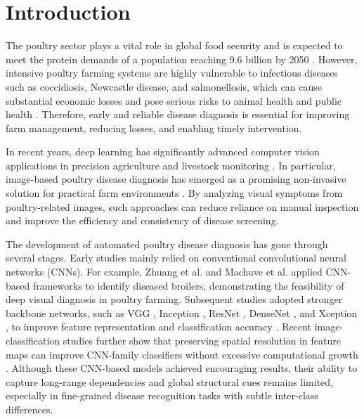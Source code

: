 \documentclass[review]{elsarticle}
\begin{document}
\linenumbers

\section{Introduction}

The poultry sector plays a vital role in global food security and is expected to meet the protein demands of a population reaching 9.6 billion by 2050 \cite{mottet2017global,hafez2020challenges}.
However, intensive poultry farming systems are highly vulnerable to infectious diseases such as coccidiosis, Newcastle disease, and salmonellosis, which can cause substantial economic losses and pose serious risks to animal health and public health \cite{fardin2025robust,abd2023poultry}.
Therefore, early and reliable disease diagnosis is essential for improving farm management, reducing losses, and enabling timely intervention.

In recent years, deep learning has significantly advanced computer vision applications in precision agriculture and livestock monitoring \cite{kamilaris2018deep,li2021survey,wang2022survey,zhang2023edge,waksman1997plantcondition,story2015greenhouse,kelly2016lesion,chen2021plantdisease,montalbo2022coffee,kaur2024cotton}.
In particular, image-based poultry disease diagnosis has emerged as a promising non-invasive solution for practical farm environments \cite{machuve2021machine,machuve2022poultry,srivastava2025integrated}.
By analyzing visual symptoms from poultry-related images, such approaches can reduce reliance on manual inspection and improve the efficiency and consistency of disease screening.

The development of automated poultry disease diagnosis has gone through several stages.
Early studies mainly relied on conventional convolutional neural networks (CNNs).
For example, Zhuang et al. \cite{zhuang2019detection} and Machuve et al. \cite{machuve2021machine,machuve2022poultry} applied CNN-based frameworks to identify diseased broilers, demonstrating the feasibility of deep visual diagnosis in poultry farming.
Subsequent studies adopted stronger backbone networks, such as VGG \cite{simonyan2014very}, Inception \cite{szegedy2016rethinking}, ResNet \cite{he2016deep}, DenseNet \cite{huang2017densely,mbelwa2021deep}, and Xception \cite{chollet2017xception}, to improve feature representation and classification accuracy \cite{lawal2024poultry,cina2023detection}.
Recent image-classification studies further show that preserving spatial resolution in feature maps can improve CNN-family classifiers without excessive computational growth \cite{rahimzadeh2024wise}.
Although these CNN-based models achieved encouraging results, their ability to capture long-range dependencies and global structural cues remains limited, especially in fine-grained disease recognition tasks with subtle inter-class differences.
\end{document}
